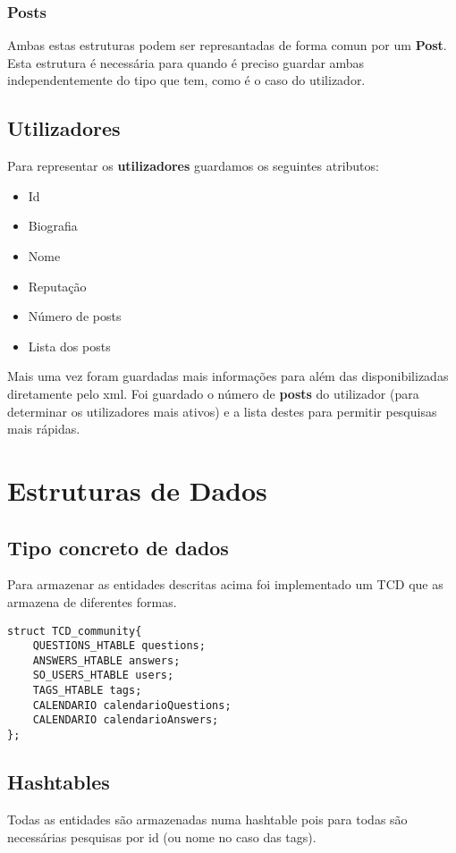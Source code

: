 \documentclass[10pt,a4paper]{article}
\begin{document}
        \subsubsection{Posts}
        Ambas estas estruturas podem ser represantadas de forma comun por um
        \textbf{Post}. Esta estrutura é necessária para quando é preciso guardar
        ambas independentemente do tipo que tem, como é o caso do utilizador.

    \subsection{Utilizadores}
    Para representar os \textbf{utilizadores} guardamos os seguintes atributos:
    \begin{multicols}{3}
    \begin{itemize}
            \item Id
            \item Biografia
            \item Nome
            \item Reputação
            \item Número de posts
            \item Lista dos posts
    \end{itemize}
    \end{multicols}
    Mais uma vez foram guardadas mais informações para além das disponibilizadas
    diretamente pelo xml. Foi guardado o número de \textbf{posts} do utilizador
    (para determinar os utilizadores mais ativos) e a lista destes para permitir
    pesquisas mais rápidas.

\section{Estruturas de Dados}
    \subsection{Tipo concreto de dados}
    Para armazenar as entidades descritas acima foi implementado um TCD que
    as armazena de diferentes formas.
    \begin{verbatim}
struct TCD_community{
    QUESTIONS_HTABLE questions;
    ANSWERS_HTABLE answers;
    SO_USERS_HTABLE users;
    TAGS_HTABLE tags;
    CALENDARIO calendarioQuestions;
    CALENDARIO calendarioAnswers;
};
    \end{verbatim}
    \subsection{Hashtables}
        Todas as entidades são armazenadas numa hashtable pois para todas são
        necessárias pesquisas por id (ou nome no caso das tags).
\end{document}
